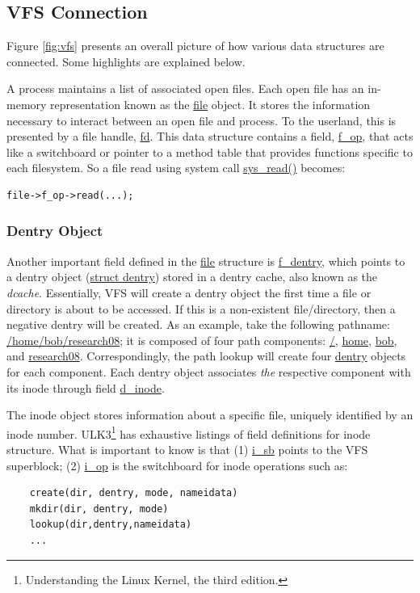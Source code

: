\subsection{VFS Connection}
\label{sec:vfsreg}

Figure \ref{fig:vfs} presents an overall picture of how various data structures
are connected. Some highlights are explained below.

A process maintains a list of associated open files. Each open file has an
in-memory representation known as the \url{file} object. It stores the
information necessary to interact between an open file and process.  To the
userland, this is presented by a file handle, \url{fd}. This data structure
contains a field, \url{f_op}, that acts like a switchboard or pointer to a
method table that provides functions specific to each filesystem. So a file
read using system call \url{sys_read()} becomes: 

\begin{Verbatim} 
file->f_op->read(...);
\end{Verbatim}

\subsubsection{Dentry Object}

Another important field defined in the \url{file} structure is \url{f_dentry},
which points to a dentry object (\url{struct dentry}) stored in a dentry
cache, also known as the \textit{dcache}. Essentially, VFS will create a
dentry object  the first time a file or directory is about to be accessed. If
this is a non-existent file/directory, then a negative dentry will be
created.  As an example, take the following pathname:
\url{/home/bob/research08}; it is composed of four path components:
\url{/}, \url{home}, \url{bob}, and \url{research08}.  Correspondingly, the
path lookup will create four \url{dentry} objects for each component.  Each
dentry object associates \textit{the} respective component with its inode
through field \url{d_inode}.

The inode object stores information about a specific file, uniquely identified
by an inode number. ULK3\footnote{Understanding the Linux Kernel, the third edition.}
has exhaustive listings of field definitions for inode structure. What is
important to know is that  (1) \url{i_sb} points to the VFS superblock; (2)
\url{i_op} is the switchboard for inode operations such as: 

\begin{Verbatim}
    create(dir, dentry, mode, nameidata) 
    mkdir(dir, dentry, mode) 
    lookup(dir,dentry,nameidata)
    ...
\end{Verbatim}

